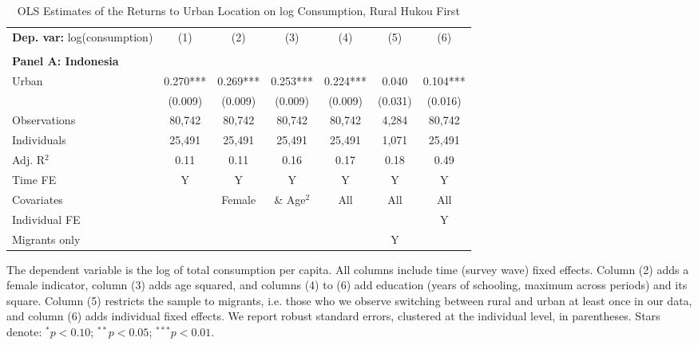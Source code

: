 \begin{table}[htbp] \centering \begin{threeparttable}
 \caption{OLS Estimates of the Returns to Urban Location on log Consumption, Rural Hukou First} 
 \label{tab:OLS_CHN_hukou_rural_first_consumption_urban_unb} 
\begin{tabular}{l cccccc} \toprule  \textbf{Dep. var:}  log(consumption) 
                    &\multicolumn{1}{c}{(1)}   &\multicolumn{1}{c}{(2)}   &\multicolumn{1}{c}{(3)}   &\multicolumn{1}{c}{(4)}   &\multicolumn{1}{c}{(5)}   &\multicolumn{1}{c}{(6)}   \\
                    &               &               &               &               &               &               \\
\textbf{Panel A: Indonesia} \\
Urban               &       0.270***&       0.269***&       0.253***&       0.224***&       0.040   &       0.104***\\
                    &     (0.009)   &     (0.009)   &     (0.009)   &     (0.009)   &     (0.031)   &     (0.016)   \\
\addlinespace
Observations        &      80,742   &      80,742   &      80,742   &      80,742   &       4,284   &      80,742   \\
Individuals         &      25,491   &      25,491   &      25,491   &      25,491   &       1,071   &      25,491   \\
Adj. R$^{2}$        &        0.11   &        0.11   &        0.16   &        0.17   &        0.18   &        0.49   \\
\cmidrule{2 -7} Time FE & Y & Y & Y & Y & Y & Y \\ Covariates & & Female & \& Age$^2$ & All & All & All \\ Individual FE & & & & & & Y \\ Migrants only & & & & & Y & \\ \bottomrule \end{tabular} \begin{tablenotes}[flushleft] \footnotesize \item{The dependent variable is the log of total consumption per capita. All columns include time (survey wave) fixed effects. Column (2) adds a female indicator, column (3) adds age squared, and columns (4) to (6) add education (years of schooling, maximum across periods) and its square. Column (5) restricts the sample to migrants, i.e. those who we observe switching between rural and urban at least once in our data, and column (6) adds individual fixed effects. We report robust standard errors, clustered at the individual level, in parentheses. Stars denote: $^{*} p<0.10$; $^{**} p<0.05$; $^{***} p<0.01$.} \end{tablenotes} \end{threeparttable} \end{table}
